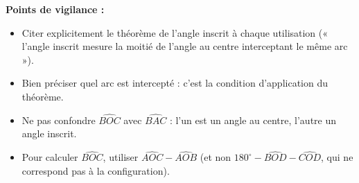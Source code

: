 \documentclass[11pt]{article}
\begin{document}
\begin{corrige}
\textbf{Points de vigilance :}
\begin{itemize}
\item Citer explicitement le théorème de l'angle inscrit à chaque utilisation (« l'angle inscrit mesure la moitié de l'angle au centre interceptant le même arc »).
\item Bien préciser quel arc est intercepté : c'est la condition d'application du théorème.
\item Ne pas confondre $\widehat{BOC}$ avec $\widehat{BAC}$ : l'un est un angle au centre, l'autre un angle inscrit.
\item Pour calculer $\widehat{BOC}$, utiliser $\widehat{AOC} - \widehat{AOB}$ (et non $180^{\circ} - \widehat{BOD} - \widehat{COD}$, qui ne correspond pas à la configuration).
\end{itemize}
\end{corrige}
\end{document}

